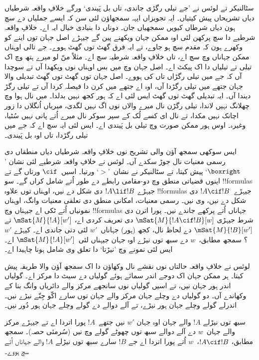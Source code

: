 \documentclass[../../../include/open-logic-section]{subfiles}
\begin{document}


سٹالنیکر تے لوئس نے ’جے تیلی رگڑی جاندی، تاں بل پَیندی‘ ورگے خلافِ واقعہ
شرطیاں دیاں تشریحاں پیش کیتیاں۔ ایہ تجویزاں ایہہ سمجھاؤن لئی سن کہ ایسے جملیاں
دے سچ ہون دیاں شرطاں کیویں سمجھیاں جان۔ دوناں دا بنیادی خیال ایہ اے۔ خلافِ
واقعہ شرطیے دا سچ پرکھن لئی اوہ ممکن جہان ویکھنے پین گے جیہڑے اصل جہان توں
اینے کو وکھرے ہون کہ مقدم سچ ہو جاوے، تے ایہ فرق گھٹ توں گھٹ ہووے۔
جے تالی اوہناں ممکن جہاناں وچ سچ اے، تاں خلافِ واقعہ شرطیہ سچ اے۔
مثلاً منّ لو میرے ہتھ وچ اک تیلی تے تیلیاں دا اک پیکٹ اے۔ اصل جہان وچ
میں بس اوہناں نوں ویکھدا آں تے سوچدا آں کہ جے میں تیلی رگڑاں تاں کی ہووے۔
اصل جہان توں گھٹ توں گھٹ تبدیلی والا جہان جتھے میں تیلی رگڑدا آں، اوہ اے
جتھے میں کرن دا فیصلہ کردا آں تے تیلی رگڑ دیندا آں۔ ایہ تبدیلی گھٹ توں گھٹ
ایس لئی اے کہ ہور کجھ نہیں بدلدا۔ میں نال ہوا وچ چھلانگ نہیں لاندا، تیلی
رگڑن نال میرے والاں نوں اگ نہیں لگدی، میریاں اُنگلاں دا زور اچانک نہیں
مکدا، تے نال ای کسے لُک کے سپر سوکر نال میرے اُتے پانی نہیں سُٹیا، وغیرہ۔
اوس ہور ممکن صورت وچ تیلی بل پَیندی اے۔ ایس لئی ایہ سچ اے کہ جے میں
تیلی رگڑدا، تاں اوہ بل پَیندی۔

ایس سوکھی سمجھ آؤن والی تشریح نوں خلافِ واقعہ شرطیاں دیاں منطقاں دی رسمی
معنیات نال جوڑ سکدے آں۔ لوئس نے خلافِ واقعہ شرطیے لئی نشان ’$\boxright$‘
پیش کیتا، تے سٹالنیکر نے نشان~’$>$‘ ورتیا۔ اسیں~$\cif$ ورتاں گے تے اینوں
قضیاتی منطق وچ دو-مقامی رابطے دے طور اُتے شامل کراں گے۔ سو !!{formula}s جیہڑے $!A \lif
!B$ دی شکل دے نیں، اوہناں توں علاوہ !!{formula}s جیہڑے~$!A \cif !B$ دی
شکل دے نیں، وی نیں۔ رسمی معنیات، امکانی منطق دی تعلقی معنیات وانگ، اوہناں نمونیاں
اُتے ٹکی اے جیہناں وچ !!{formula}s جہاناں اُتے پرکھے جاندے نیں۔ پورا اترن دی
شرط جیہڑی $\mSat{M}{!A \cif !B}[w]$ دی تعریف کردی اے، $\mSat{M}{!A}[w']$ تے $\mSat{M}{!B}[w']$ دے لحاظ نال،
کجھ (ہور) جہاناں~$w'$ لئی دتی جاندی اے۔ کیہڑے $w'$؟ سمجھ مطابق،~$w$ دے سبھ توں نیڑے اوہ جہان
جیہناں لئی~$\mSat{M}{!A}[w']$ اے۔ ایس لئی نمونے وچ ’نیڑتا‘ دا تعلق وی
شامل ہونا چاہیدا اے۔

لوئس نے خلافِ واقعہ حالتاں نوں نقشے نال وکھاؤن دا اک سمجھ آؤن والا
طریقہ پیش کیتا۔ ہر ممکن جہان اک دوجے اندر سمائے ہوئے گولیاں دے سیٹ دا مرکز
اے۔ گولیاں اندر ہور جہان نیں، تے اسیں گولیاں نوں سانجھے مرکز والے دائریاں
وانگ بنا کے وکھاندے آں۔ دو گولیاں دے وچلے جہان مرکز والے جہان توں سارے
اکّو جِنّے نیڑے نیں۔ اندرلے گولے وچلے جہان ہور نیڑے، تے آلے دوالے دے گولے
وچلے جہان ہور دُور نیں۔
\begin{center}
\end{center}
سبھ توں نیڑلے $!A$ والے جہان اوہ جہان $w'$ نیں جتھے~$!A$ پورا اتردا اے
تے جیہڑے مرکز والے جہان~$w$ دے آلے دوالے سبھ توں چھوٹے گولے وچ نیں
(سُرمئی حصہ)۔ سمجھ مطابق، $!A \cif !B$،~$w$ اُتے پورا اتردا اے جے $!B$
سارے سبھ توں نیڑلے $!A$ والے جہاناں اُتے سچ ہووے۔
\end{document}
